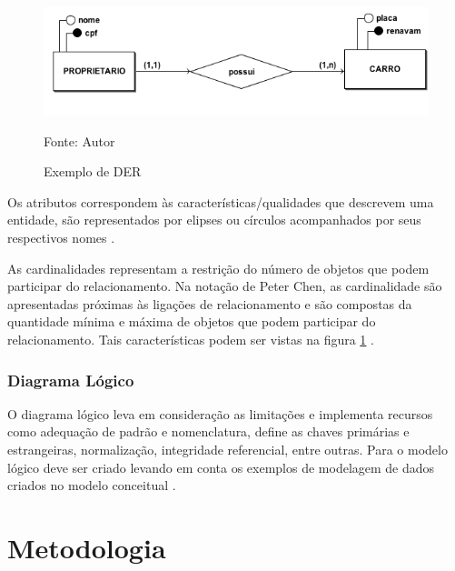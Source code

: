\begin{figure}[h]
	\centering
	\includegraphics[keepaspectratio=true,scale=0.5]{figuras/figura1.png}
	\caption{Exemplo de DER}
	Fonte: Autor
	\label{figura1}
\end{figure}

Os atributos correspondem às características/qualidades que descrevem uma entidade, são representados por
elipses ou círculos acompanhados por seus respectivos nomes \cite{sistemadebancos}.

As cardinalidades representam a restrição do número de objetos que podem participar do relacionamento. Na notação
de Peter Chen, as cardinalidade são apresentadas próximas às ligações de relacionamento e são compostas da quantidade
mínima e máxima de objetos que podem participar do relacionamento. Tais características podem ser vistas 
na figura \ref{figura1} \cite{sistemadebancos}.

\subsection{Diagrama Lógico}
O diagrama lógico leva em consideração as limitações e implementa recursos como adequação de padrão e nomenclatura, define as
chaves primárias e estrangeiras, normalização, integridade referencial, entre outras. Para o modelo lógico deve ser criado 
levando em conta os exemplos de modelagem de dados criados no modelo conceitual \cite{sistemadebancos}.




\chapter{Metodologia}

